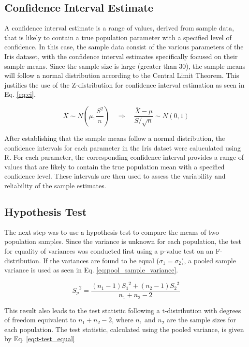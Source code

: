 \documentclass{article}
\begin{document}
\subsection{Confidence Interval Estimate}

A confidence interval estimate is a range of values, derived from sample data, that is likely to contain a true population parameter with a specified level of confidence. In this case, the sample data consist of the various parameters of the Iris dataset, with the confidence interval estimates specifically focused on their sample means. Since the sample size is large (greater than 30), the sample means will follow a normal distribution according to the Central Limit Theorem. This justifies the use of the Z-distribution for confidence interval estimation as seen in Eq. \ref{eq:ci}.

\begin{equation}
\bar{X} \sim N\left(\mu, \frac{S^2}{n}\right) \quad \Rightarrow \quad \frac{\bar{X} - \mu}{S/\sqrt{n}} \sim N(0,1) \label{eq:ci}
\end{equation}

After establishing that the sample means follow a normal distribution, the confidence intervals for each parameter in the Iris datset were caluculated using R. For each parameter, the corresponding confidence interval provides a range of values that are likely to contain the true population mean with a specified confidence level. These intervals are then used to assess the variability and reliability of the sample estimates. 

\subsection{Hypothesis Test}

The next step was to use a hypothesis test to compare the means of two population samples. Since the variance is unknown for each population, the test for equality of variances was conducted first using a p-value test on an F-distribution. If the variances are found to be equal ($\sigma_1 = \sigma_2$), a pooled sample variance is used as seen in Eq. \ref{eq:pool_sample_variance}.

\begin{equation}
	{S_p}^2 = \frac{(n_1 - 1) {S_1}^2 + (n_2 -1) {S_2}^2}{n_1 + n_2 -2}
	\label{eq:pool_sample_variance}
\end{equation}

This result also leads to the test statistic following a t-distribution with degrees of freedom equivalent to $n_1+n_2-2$, where $n_1$ and $n_2$ are the sample sizes for each population. The test statistic, calculated using the pooled variance, is given by Eq. \ref{eq:t-test_equal}
\end{document}
